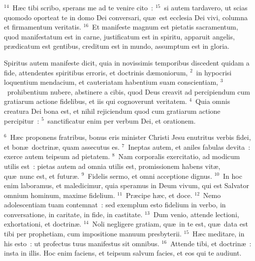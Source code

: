 ${}^{14}$~H\ae c tibi scribo, sperans me ad te venire cito~:
${}^{15}$~si autem tardavero, ut scias quomodo oporteat te in domo Dei conversari, qu\ae\ est ecclesia Dei vivi, columna et firmamentum veritatis.
${}^{16}$~Et manifeste magnum est pietatis sacramentum, quod manifestatum est in carne, justificatum est in spiritu, apparuit angelis, pr\ae dicatum est gentibus, creditum est in mundo, assumptum est in gloria.

\bchapter
\lettrine[lines=3,image=true,loversize=0.05,lraise=-0.03]{S}{}piritus autem manifeste dicit, quia in novissimis temporibus discedent quidam a fide, attendentes spiritibus erroris, et doctrinis d\ae moniorum,
${}^{2}$~in hypocrisi loquentium mendacium, et cauteriatam habentium suam conscientiam,
${}^{3}$~prohibentium nubere, abstinere a cibis, quod Deus creavit ad percipiendum cum gratiarum actione fidelibus, et iis qui cognoverunt veritatem.
${}^{4}$~Quia omnis creatura Dei bona est, et nihil rejiciendum quod cum gratiarum actione percipitur~:
${}^{5}$~sanctificatur enim per verbum Dei, et orationem.


${}^{6}$~H\ae c proponens fratribus, bonus eris minister Christi Jesu enutritus verbis fidei, et bon\ae\ doctrin\ae , quam assecutus es.
${}^{7}$~Ineptas autem, et aniles fabulas devita~: exerce autem teipsum ad pietatem.
${}^{8}$~Nam corporalis exercitatio, ad modicum utilis est~: pietas autem ad omnia utilis est, promissionem habens vit\ae , qu\ae\ nunc est, et futur\ae .
${}^{9}$~Fidelis sermo, et omni acceptione dignus.
${}^{10}$~In hoc enim laboramus, et maledicimur, quia speramus in Deum vivum, qui est Salvator omnium hominum, maxime fidelium.
${}^{11}$~Pr\ae cipe h\ae c, et doce.
${}^{12}$~Nemo adolescentiam tuam contemnat~: sed exemplum esto fidelium in verbo, in conversatione, in caritate, in fide, in castitate.
${}^{13}$~Dum venio, attende lectioni, exhortationi, et doctrin\ae .
${}^{14}$~Noli negligere gratiam, qu\ae\ in te est, qu\ae\ data est tibi per prophetiam, cum impositione manuum presbyterii.
${}^{15}$~H\ae c meditare, in his esto~: ut profectus tuus manifestus sit omnibus.
${}^{16}$~Attende tibi, et doctrin\ae~: insta in illis. Hoc enim faciens, et teipsum salvum facies, et eos qui te audiunt.

